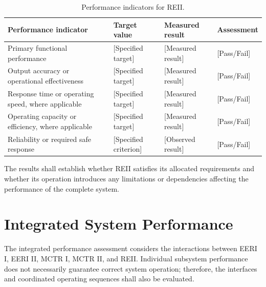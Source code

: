 \begin{table}[H]
    \centering
    \caption{Performance indicators for REII.}
    \label{tab:reii-performance}
    \renewcommand{\arraystretch}{1.4}
    \begin{tabularx}{\textwidth}{|X|X|X|X|}
        \hline
        \textbf{Performance indicator} &
        \textbf{Target value} &
        \textbf{Measured result} &
        \textbf{Assessment} \\
        \hline
        Primary functional performance &
        [Specified target] &
        [Measured result] &
        [Pass/Fail] \\
        \hline
        Output accuracy or operational effectiveness &
        [Specified target] &
        [Measured result] &
        [Pass/Fail] \\
        \hline
        Response time or operating speed,
        where applicable &
        [Specified target] &
        [Measured result] &
        [Pass/Fail] \\
        \hline
        Operating capacity or efficiency,
        where applicable &
        [Specified target] &
        [Measured result] &
        [Pass/Fail] \\
        \hline
        Reliability or required safe response &
        [Specified criterion] &
        [Observed result] &
        [Pass/Fail] \\
        \hline
    \end{tabularx}
\end{table}

The results shall establish whether REII satisfies its allocated
requirements and whether its operation introduces any limitations
or dependencies affecting the performance of the complete system.

\section{Integrated System Performance}
\label{sec:integrated-performance}

The integrated performance assessment considers the interactions
between EERI I, EERI II, MCTR I, MCTR II, and REII. Individual
subsystem performance does not necessarily guarantee correct
system operation; therefore, the interfaces and coordinated
operating sequences shall also be evaluated.

